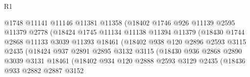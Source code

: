 \begin{lexlean}{R1}
\begin{coremodule}
                                @1748
                                @11141
                                @11146
                                @11381
                                @11358
                                (@18402
                                  @1746
                                  @926
                                  @11139
                                  @2595
                                  @11379
                                  @2778
                                  (@18424
                                    @1745
                                    @11134
                                    @11138
                                    @11394
                                    @11379
                                    (@18430
                                      @1744
                                      @2868
                                      @11133
                                      @3039
                                      @11393
                                      @18461
                                      (@18402
                                        @938
                                        @120
                                        @2896
                                        @2593
                                        @3115
                                        @2435
                                        (@18424
                                          @937
                                          @2891
                                          @2895
                                          @3132
                                          @3115
                                          (@18430
                                            @936
                                            @2868
                                            @2890
                                            @3039
                                            @3131
                                            @18461
                                            (@18402
                                              @934
                                              @120
                                              @2888
                                              @2593
                                              @3129
                                              @2435
                                              (@18436
                                                @933
                                                @2882
                                                @2887
                                                @3152

\end{coremodule}
\end{lexlean}
